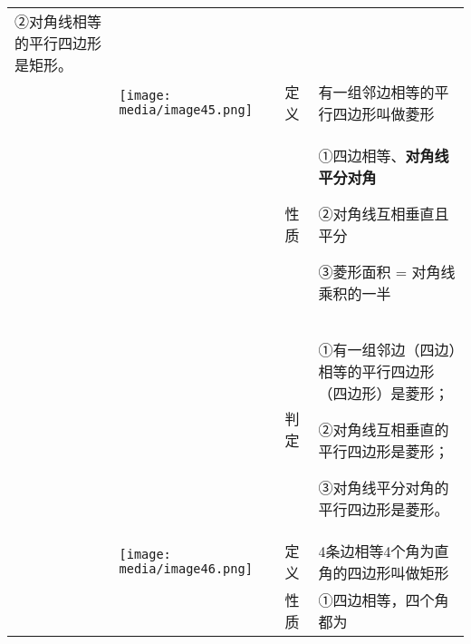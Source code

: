 \documentclass[a4paper,11pt,UTF8]{ctexart}
\begin{document}
\begin{longtable}[]{@{}llll@{}}
\begin{minipage}[t]{0.22\columnwidth}
②对角线相等的平行四边形是矩形。\strut
\end{minipage}\tabularnewline
& \texttt{[image: media/image45.png]}
& 定义 & 有一组邻边相等的平行四边形叫做菱形\tabularnewline
\begin{minipage}[t]{0.22\columnwidth}\raggedright
\strut
\end{minipage} & \begin{minipage}[t]{0.22\columnwidth}\raggedright
\strut
\end{minipage} & \begin{minipage}[t]{0.22\columnwidth}\raggedright
性质\strut
\end{minipage} & \begin{minipage}[t]{0.22\columnwidth}\raggedright
①四边相等、\textbf{对角线平分对角}

②对角线互相垂直且平分

③菱形面积 = 对角线乘积的一半\strut
\end{minipage}\tabularnewline
\begin{minipage}[t]{0.22\columnwidth}\raggedright
\strut
\end{minipage} & \begin{minipage}[t]{0.22\columnwidth}\raggedright
\strut
\end{minipage} & \begin{minipage}[t]{0.22\columnwidth}\raggedright
判定\strut
\end{minipage} & \begin{minipage}[t]{0.22\columnwidth}\raggedright
①有一组邻边（四边）相等的平行四边形（四边形）是菱形；

②对角线互相垂直的平行四边形是菱形；

③对角线平分对角的平行四边形是菱形。\strut
\end{minipage}\tabularnewline
& \texttt{[image: media/image46.png]}
& 定义 & 4条边相等4个角为直角的四边形叫做矩形\tabularnewline
\begin{minipage}[t]{0.22\columnwidth}\raggedright
\strut
\end{minipage} & \begin{minipage}[t]{0.22\columnwidth}\raggedright
\strut
\end{minipage} & \begin{minipage}[t]{0.22\columnwidth}\raggedright
性质\strut
\end{minipage} & \begin{minipage}[t]{0.22\columnwidth}\raggedright
①四边相等，四个角都为


\end{minipage}
\end{longtable}
\end{document}
